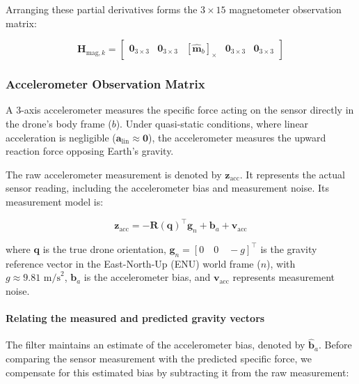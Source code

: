 \documentclass{article}
\begin{document}
	Arranging these partial derivatives forms the $3\times15$ magnetometer observation matrix:
	
	\begin{equation}
		\boxed{
			\mathbf{H}_{\text{mag},k} =
			\begin{bmatrix}
				\mathbf{0}_{3\times3} &
				\mathbf{0}_{3\times3} &
				[\hat{\mathbf{m}}_b]_\times &
				\mathbf{0}_{3\times3} &
				\mathbf{0}_{3\times3}
			\end{bmatrix}
		}
	\end{equation}


	\subsubsection{Accelerometer Observation Matrix}
	
	A 3-axis accelerometer measures the specific force acting on the sensor directly in the drone's body frame ($b$). Under quasi-static conditions, where linear acceleration is negligible ($\mathbf{a}_{\text{lin}} \approx \mathbf{0}$), the accelerometer measures the upward reaction force opposing Earth's gravity.
	
	The raw accelerometer measurement is denoted by $\mathbf{z}_{\text{acc}}$. It represents the actual sensor reading, including the accelerometer bias and measurement noise. Its measurement model is:
	
	\begin{equation*}
		\mathbf{z}_{\text{acc}} =
		-\mathbf{R}(\mathbf{q})^\top \mathbf{g}_n
		+ \mathbf{b}_a
		+ \mathbf{v}_{\text{acc}}
	\end{equation*}
	
	where $\mathbf{q}$ is the true drone orientation, $\mathbf{g}_n = [0 \quad 0 \quad -g]^\top$ is the gravity reference vector in the East-North-Up (ENU) world frame ($n$), with $g \approx 9.81 \text{ m/s}^2$, $\mathbf{b}_a$ is the accelerometer bias, and $\mathbf{v}_{\text{acc}}$ represents measurement noise.
	
	\paragraph{Relating the measured and predicted gravity vectors}
	
	The filter maintains an estimate of the accelerometer bias, denoted by $\hat{\mathbf{b}}_a$. Before comparing the sensor measurement with the predicted specific force, we compensate for this estimated bias by subtracting it from the raw measurement:
	
\end{document}
